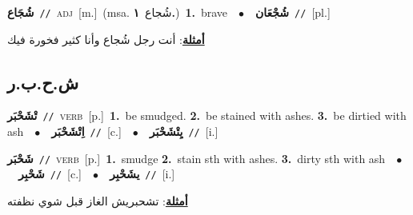 \documentclass[10pt,a4paper,twoside]{article} %
\begin{document}
\begin{multicols}{2}
{\setlength\topsep{0pt}\textbf{\foreignlanguage{arabic}{شُجَاع}}\ {\color{gray}\texttt{//}\color{black}}\ \textsc{adj}\ [m.]\ \color{gray}(msa. \foreignlanguage{arabic}{شُجاع}~\foreignlanguage{arabic}{\textbf{١.}})\color{black}\ \textbf{1.}~brave\ \ $\bullet$\ \ \setlength\topsep{0pt}\textbf{\foreignlanguage{arabic}{شُجْعَان}}\ {\color{gray}\texttt{//}\color{black}}\ [pl.]\  \begin{flushright}\color{gray}\foreignlanguage{arabic}{\textbf{\underline{\foreignlanguage{arabic}{أمثلة}}}: أنت رجل شُجاع وأنا كثير فخورة فيك}\end{flushright}\color{black}} \vspace{2mm}

\vspace{-3mm}
\subsection*{\color{blue}\foreignlanguage{arabic}{ش.ح.ب.ر}\color{blue}{}} 

{\setlength\topsep{0pt}\textbf{\foreignlanguage{arabic}{تْشَحْبَر}}\ {\color{gray}\texttt{//}\color{black}}\ \textsc{verb}\ [p.]\ \textbf{1.}~be smudged.  \textbf{2.}~be stained with ashes.  \textbf{3.}~be dirtied with ash\ \ $\bullet$\ \ \setlength\topsep{0pt}\textbf{\foreignlanguage{arabic}{اِتْشَحْبَر}}\ {\color{gray}\texttt{//}\color{black}}\ [c.]\ \ $\bullet$\ \ \setlength\topsep{0pt}\textbf{\foreignlanguage{arabic}{يِتْشَحْبَر}}\ {\color{gray}\texttt{//}\color{black}}\ [i.]\ } \vspace{2mm}

{\setlength\topsep{0pt}\textbf{\foreignlanguage{arabic}{شَحْبَر}}\ {\color{gray}\texttt{//}\color{black}}\ \textsc{verb}\ [p.]\ \textbf{1.}~smudge  \textbf{2.}~stain sth with ashes.  \textbf{3.}~dirty sth with ash\ \ $\bullet$\ \ \setlength\topsep{0pt}\textbf{\foreignlanguage{arabic}{شَحْبِر}}\ {\color{gray}\texttt{//}\color{black}}\ [c.]\ \ $\bullet$\ \ \setlength\topsep{0pt}\textbf{\foreignlanguage{arabic}{يشَحْبِر}}\ {\color{gray}\texttt{//}\color{black}}\ [i.]\  \begin{flushright}\color{gray}\foreignlanguage{arabic}{\textbf{\underline{\foreignlanguage{arabic}{أمثلة}}}: تشحبريش الغاز قبل شوي نظفته}\end{flushright}\color{black}} \vspace{2mm}


\end{multicols}
\end{document}
